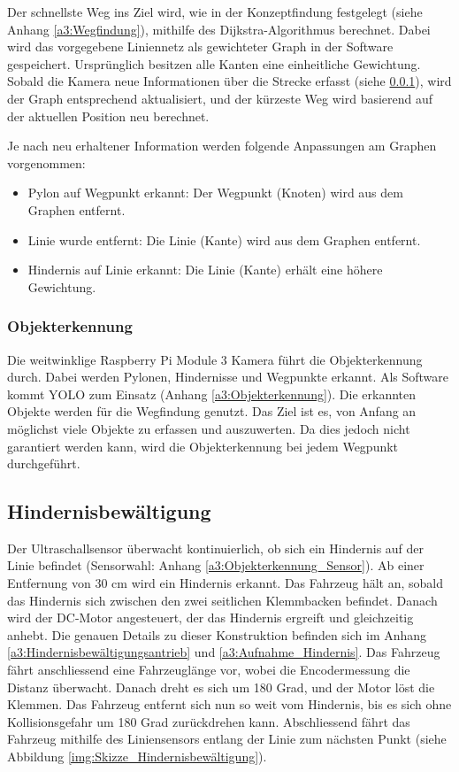 \documentclass[../main.tex]{subfiles}
\begin{document}
Der schnellste Weg ins Ziel wird, wie in der Konzeptfindung festgelegt (siehe Anhang \ref{a3:Wegfindung}), mithilfe des Dijkstra-Algorithmus berechnet. Dabei wird das vorgegebene Liniennetz als gewichteter Graph in der Software gespeichert. Ursprünglich besitzen alle Kanten eine einheitliche Gewichtung. Sobald die Kamera neue Informationen über die Strecke erfasst (siehe \ref{sub:Objekterkennung}), wird der Graph entsprechend aktualisiert, und der kürzeste Weg wird basierend auf der aktuellen Position neu berechnet.

Je nach neu erhaltener Information werden folgende Anpassungen am Graphen vorgenommen: \begin{itemize} 
  \item Pylon auf Wegpunkt erkannt: Der Wegpunkt (Knoten) wird aus dem Graphen entfernt.
  \item Linie wurde entfernt: Die Linie (Kante) wird aus dem Graphen entfernt. 
  \item Hindernis auf Linie erkannt: Die Linie (Kante) erhält eine höhere Gewichtung.
\end{itemize}

\subsubsection{Objekterkennung} \label{sub:Objekterkennung}
Die weitwinklige Raspberry Pi Module 3 Kamera führt die Objekterkennung durch. Dabei werden Pylonen, Hindernisse und Wegpunkte erkannt. Als Software kommt YOLO zum Einsatz (Anhang \ref{a3:Objekterkennung}). Die erkannten Objekte werden für die Wegfindung genutzt. Das Ziel ist es, von Anfang an möglichst viele Objekte zu erfassen und auszuwerten. Da dies jedoch nicht garantiert werden kann, wird die Objekterkennung bei jedem Wegpunkt durchgeführt. 

\subsection{Hindernisbewältigung}
Der Ultraschallsensor überwacht kontinuierlich, ob sich ein Hindernis auf der Linie befindet (Sensorwahl: Anhang \ref{a3:Objekterkennung_Sensor}). Ab einer Entfernung von 30 cm wird ein Hindernis erkannt. Das Fahrzeug hält an, sobald das Hindernis sich zwischen den zwei seitlichen Klemmbacken befindet. Danach wird der DC-Motor angesteuert, der das Hindernis ergreift und gleichzeitig anhebt. Die genauen Details zu dieser Konstruktion befinden sich im Anhang \ref{a3:Hindernisbewältigungsantrieb} und \ref{a3:Aufnahme_Hindernis}.
Das Fahrzeug fährt anschliessend eine Fahrzeuglänge vor, wobei die Encodermessung die Distanz überwacht. Danach dreht es sich um 180 Grad, und der Motor löst die Klemmen. Das Fahrzeug entfernt sich nun so weit vom Hindernis, bis es sich ohne Kollisionsgefahr um 180 Grad zurückdrehen kann. Abschliessend fährt das Fahrzeug mithilfe des Liniensensors entlang der Linie zum nächsten Punkt (siehe Abbildung \ref{img:Skizze_Hindernisbewältigung}).
\end{document}
